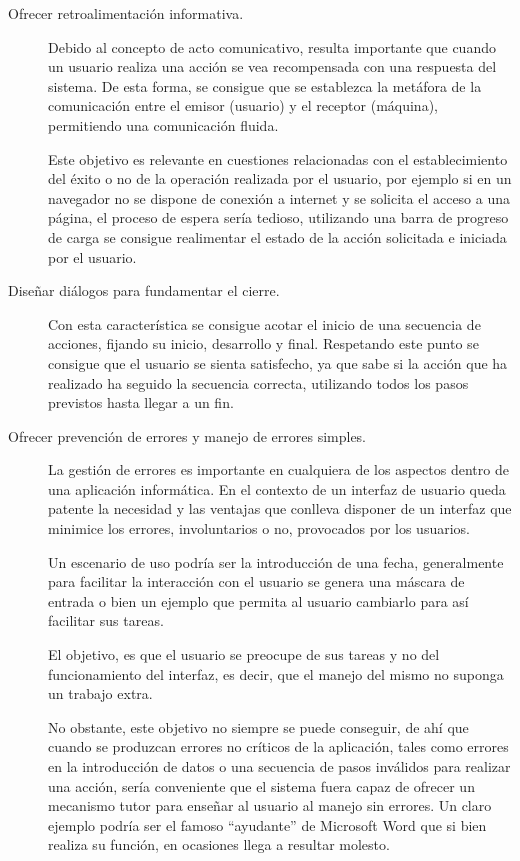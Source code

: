 \begin{description}
\item[Ofrecer retroalimentación informativa.] Debido al concepto de acto
comunicativo, resulta importante que cuando un usuario realiza una acción se vea recompensada con una respuesta del sistema. 
De esta forma, se consigue que se establezca la metáfora de la comunicación entre el 
emisor (usuario) y el receptor (máquina), permitiendo una comunicación fluida.

Este objetivo es relevante en cuestiones relacionadas con el establecimiento del éxito o no de la operación 
realizada por el usuario, por ejemplo si en un navegador no se dispone de conexión a internet 
y se solicita el acceso a una página, el proceso de espera sería tedioso, utilizando una barra de 
progreso de carga se consigue realimentar el estado de la acción solicitada e iniciada por el usuario.

\item[Diseñar diálogos para fundamentar el cierre.] Con esta característica
se consigue acotar el inicio de una secuencia de acciones, fijando
su inicio, desarrollo y final. Respetando este punto se consigue que el usuario se sienta satisfecho, ya que sabe si la acción que ha realizado ha seguido la secuencia correcta, utilizando todos los pasos previstos hasta llegar a un fin.

\item[Ofrecer prevención de errores y manejo de errores simples.] La gestión de
errores es importante en cualquiera de los aspectos dentro de una aplicación informática.
En el contexto de un interfaz de usuario queda patente la necesidad y las ventajas que conlleva 
disponer de un interfaz que minimice los errores, involuntarios o no, provocados por los usuarios.

Un escenario de uso podría ser la introducción de una fecha, generalmente para facilitar 
la interacción con el usuario se genera una máscara de entrada o bien un ejemplo que 
permita al usuario cambiarlo para así facilitar sus tareas.

El objetivo, es que el usuario se preocupe de sus tareas y no del funcionamiento del 
interfaz, es decir, que el manejo del mismo no suponga un trabajo extra.

No obstante, este objetivo no siempre se puede conseguir, de ahí que cuando se produzcan errores 
no críticos de la aplicación, tales como errores en la introducción de 
datos o una secuencia de pasos inválidos para realizar una acción, sería conveniente que el sistema fuera capaz de ofrecer 
un mecanismo tutor para enseñar al usuario al manejo sin errores. 
Un claro ejemplo podría ser el famoso ``ayudante'' de Microsoft Word que si bien realiza su función, en ocasiones llega a resultar molesto.


\end{description}
